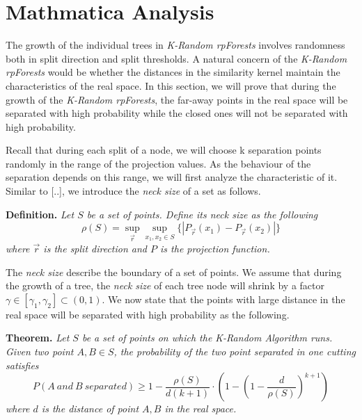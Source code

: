 \section{Mathmatica Analysis}

The growth of the individual trees in \textit{K-Random rpForests} involves randomness both in split direction and split thresholds. A natural concern of the \textit{K-Random rpForests} would be whether the distances in the similarity kernel maintain the characteristics of the real space. In this section, we will prove that during the growth of the \textit{K-Random rpForests}, the far-away points in the real space will be separated with high probability while the closed ones will not be separated with high probability.

Recall that during each split of a node, we will choose k separation points randomly in the range of the projection values. As the behaviour of the separation depends on this range, we will first analyze the characteristic of it. Similar to [..], we introduce the \textit{neck size} of a set as follows.

\textbf{Definition.}\textit{
    Let $S$ be a set of points. Define its neck size as the following
    \begin{equation}
    \nonumber
        \rho(S) = \sup_{\vec{r}}\sup_{x_1, x_2 \in S}\{|P_{\vec{r}}(x_1) - P_{\vec{r}}(x_2)|\}
    \end{equation}
    where $\vec{r}$ is the split direction and $P$ is the projection function.
}

The \textit{neck size} describe the boundary of a set of points. We assume that during the growth of a tree, the \textit{neck size} of each tree node will shrink by a factor $\gamma \in [\gamma_1, \gamma_2] \subset (0, 1)$. We now state that the points with large distance in the real space will be separated with high probability as the following.

\textbf{Theorem.}\textit{
    Let $S$ be a set of points on which the K-Random Algorithm runs. Given two point $A, B \in S$, the probability of the two point separated in one cutting satisfies
    \begin{equation}
        P(A\ and\ B\ separated) \ge 1 - \frac{\rho(S)}{d(k+1)} \cdot (1 - (1 - \frac{d}{\rho(S)})^{k+1})
    \end{equation}
    where $d$ is the distance of point $A, B$ in the real space.
}


